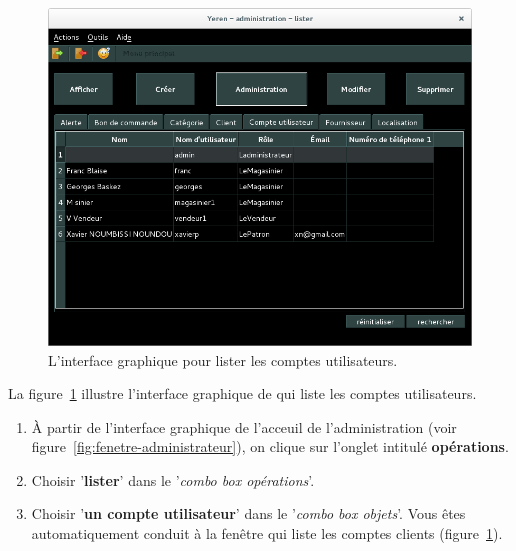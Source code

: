 \begin{figure}[!htpb]
	\centering
	\includegraphics[scale=0.45]{images/compte-utilisateur-lister.png}
	\caption{L'interface graphique pour lister les comptes utilisateurs.}
	\label{fig:admin-comptes-utilisateurs-lister}
\end{figure}

La figure~\ref{fig:admin-comptes-utilisateurs-lister}
illustre l'interface graphique de \yeroth qui liste les
comptes utilisateurs.

\begin{enumerate}[1)]
	\item \`A partir de l'interface graphique de l'acceuil de
		l'administration (voir figure~\ref{fig:fenetre-administrateur}),
		on clique sur l'onglet intitul\'e \textbf{op\'erations}. 
		
	\item Choisir '\textbf{lister}' dans le '\emph{combo box
		op\'erations}'.
		
	\item Choisir '\textbf{un compte utilisateur}' dans
		le '\emph{combo box objets}'. Vous \^etes automatiquement
		conduit \`a la fen\^etre qui liste les comptes clients
		(figure~\ref{fig:admin-comptes-utilisateurs-lister}).
\end{enumerate}


\newpage
{}

